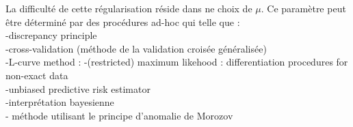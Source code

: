 La difficulté de cette régularisation réside dans ne choix de $\mu$. Ce paramètre peut être déterminé par des procédures ad-hoc qui telle que : \\
-discrepancy principle\\
-cross-validation (méthode de la validation croisée généralisée)\\
-L-curve method : %
-(restricted) maximum likehood : %
differentiation procedures for non-exact data\\
-unbiased predictive risk estimator\\
-interprétation bayesienne \citep{Pereira2015}\\
- méthode utilisant le principe d’anomalie de Morozov\\

